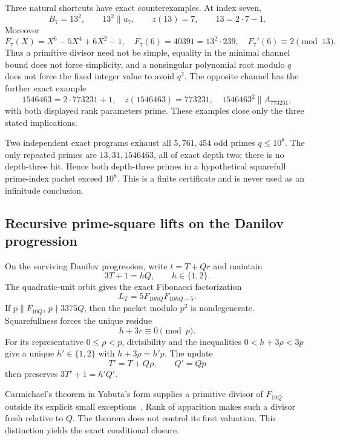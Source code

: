 Three natural shortcuts have exact counterexamples.  At index seven,
\[
 B_7=13^2,\qquad 13^2\parallel u_7,\qquad z(13)=7,
 \qquad13=2\cdot7-1.
\]
Moreover
\[
 F_7(X)=X^6-5X^4+6X^2-1,\quad
 F_7(6)=40391=13^2\cdot239,\quad F_7'(6)\equiv2\pmod{13}.
\]
Thus a primitive divisor need not be simple, equality in the minimal channel
bound does not force simplicity, and a nonsingular polynomial root modulo
$q$ does not force the fixed integer value to avoid $q^2$.  The opposite
channel has the further exact example
\[
 1546463=2\cdot773231+1,\quad z(1546463)=773231,\quad
 1546463^2\parallel A_{773231},
\]
with both displayed rank parameters prime.  These examples close only the
three stated implications.

Two independent exact programs exhaust all $5{,}761{,}454$ odd primes
$q\leq10^8$.  The only repeated primes are $13,31,1546463$, all of exact
depth two; there is no depth-three hit.  Hence both depth-three primes in a
hypothetical squarefull prime-index packet exceed $10^8$.  This is a finite
certificate and is never used as an infinitude conclusion.

\subsection{Recursive prime-square lifts on the Danilov progression}

On the surviving Danilov progression, write $t=T+Qr$ and maintain
\begin{equation}\label{eq:gpsp-dan-state}
                         3T+1=hQ,\qquad h\in\{1,2\}.
\end{equation}
The quadratic-unit orbit gives the exact Fibonacci factorization
\begin{equation}\label{eq:gpsp-dan-fib}
                         L_T=5F_{10hQ}F_{10hQ-5}.
\end{equation}
If $p\parallel F_{10Q}$, $p\nmid3375Q$, then the packet modulo $p^2$ is
nondegenerate.  Squarefullness forces the unique residue
\begin{equation}\label{eq:gpsp-dan-root}
                         h+3r\equiv0\pmod p.
\end{equation}
For its representative $0\leq\rho<p$, divisibility and the inequalities
$0<h+3\rho<3p$ give a unique $h'\in\{1,2\}$ with
$h+3\rho=h'p$.  The update
\[
                 T'=T+Q\rho,\qquad Q'=Qp
\]
then preserves $3T'+1=h'Q'$.

Carmichael's theorem in Yabuta's form supplies a primitive divisor of
$F_{10Q}$ outside its explicit small exceptions~\cite{Yabuta2001}.  Rank of
apparition makes such a divisor fresh relative to $Q$.  The theorem does not
control its first valuation.  This distinction yields the exact conditional
closure.

